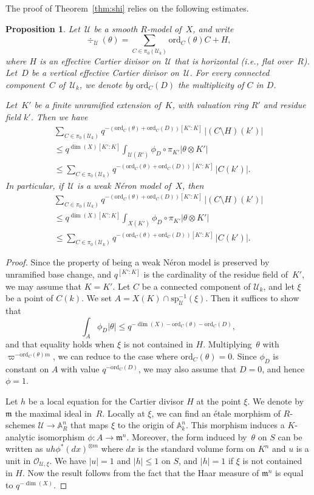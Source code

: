 \documentclass[JEP,XML,SOM,Unicode,NoFloatCountersInSection]{cedram}
\let\mathcal\mathscr
\newtheorem{prop}[equation]{Proposition}
\theoremstyle{definition}
\numberwithin{equation}{subsection}
\newcommand{\A}{\ensuremath{\mathbb{A}}}
\newcommand{\cU}{\ensuremath{\mathscr{U}}}
\newcommand{\ord}{\mathrm{ord}}
\newcommand{\spe}{\mathrm{sp}}
\let\form\theta
\let\unif\varpi
\begin{document}
The proof of Theorem~\ref{thm:shi} relies on the following estimates.
\begin{prop}\label{prop:int}
Let~$\cU$ be a smooth $R$\nobreakdash-model of~$X$, and write
\[
\div_{\cU}(\form)=\sum_{C\in \pi_0(\cU_k)}\ord_C(\form)C+H,
\]
where $H$ is an effective Cartier divisor on~$\cU$ that is horizontal (i.e., flat over~$R$).
Let~$D$ be a vertical effective Cartier divisor on~$\cU$. For every connected component~$C$ of~$\cU_k$, we denote by $\ord_C(D)$ the multiplicity of $C$ in $D$.

Let~$K'$ be a finite unramified extension of~$K$, with valuation ring $R'$ and residue field $k'$.
Then we have
\begin{multline*}
\sum_{C\in \pi_0(\cU_k)}q^{-(\ord_C(\form)+\ord_C(D))[K'\colon K]}\,|(C\setminus H)(k')|\\[-8pt]
\leq q^{\dim(X)[K'\colon K]} \int_{\cU(R')}\phi_D\circ\pi_{K'} |\form\otimes K'| \\
\leq \sum_{C\in \pi_0(\cU_k)}q^{-(\ord_C(\form)+\ord_C(D))[K'\colon K]}\,|C(k')|.
\end{multline*}
In particular, if~$\cU$ is a weak Néron model of~$X$, then
\begin{multline*}
\sum_{C\in \pi_0(\cU_k)}q^{-(\ord_C(\form)+\ord_C(D))[K'\colon K]}\,|(C\setminus H)(k')|\\[-8pt]
\leq q^{\dim(X)[K'\colon K]} \int_{X(K')}\phi_D\circ\pi_{K'} |\form\otimes K'| \\
\leq \sum_{C\in \pi_0(\cU_k)}q^{-(\ord_C(\form)+\ord_C(D))[K'\colon K]}\,|C(k')|.
\end{multline*}
\end{prop}
\begin{proof}
Since the property of being a weak Néron model is preserved by unramified base change, and $q^{[K'\colon K]}$ is the cardinality of the residue field of~$K'$, we may assume that $K=K'$.
Let $C$ be a connected component of $\cU_k$, and let $\xi$ be a point of $C(k)$.
We set $A=X(K)\cap \spe_{\cU}^{-1}(\xi)$.
Then it suffices to show that
\[
\int_{A}\phi_D|\form| \leq q^{-\dim(X)-\ord_C(\form)-\ord_C(D)},
\]
and that equality holds when $\xi$ is not contained in $H$. Multiplying~$\form$ with $\unif^{-\ord_C(\form)m}$, we can reduce to the case where
$\ord_C(\form)=0$. Since $\phi_D$ is constant on $A$ with value $q^{-\ord_C(D)}$, we may also assume that $D=0$, and hence $\phi=1$.

Let $h$ be a local equation for the Cartier divisor $H$ at the point $\xi$.
We denote by~$\mathfrak{m}$ the maximal ideal in~$R$.
Locally at $\xi$, we can find an étale morphism of $R$\nobreakdash-schemes $\cU\to \A^n_R$ that maps $\xi$ to the origin of $\A^n_k$.
This morphism induces a $K$\nobreakdash-analytic isomorphism $\phi:A\to \mathfrak{m}^n$. Moreover,
the form induced by~$\form$ on $S$ can be written as $uh\phi^*(dx)^{\otimes m}$ where $dx$ is the standard volume form on $K^n$ and $u$ is a unit in $\mathcal{O}_{\cU,\xi}$.
We have $|u|=1$ and $|h|\leq 1$ on $S$, and $|h|=1$ if $\xi$ is not contained in $H$. Now the result follows from the fact that the Haar measure of $\mathfrak{m}^n$ is equal to $q^{-\dim(X)}$.
\end{proof}
\end{document}
